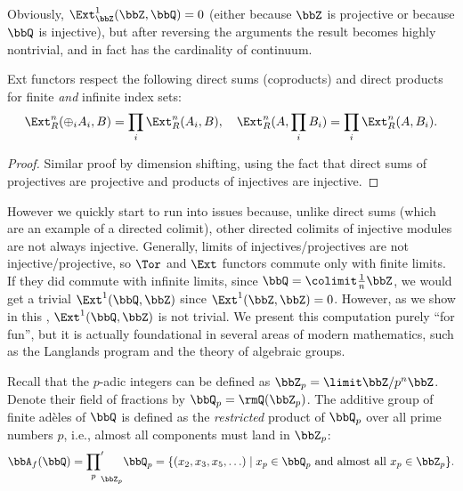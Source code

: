 Obviously, $\Ext^1_\bbZ(\bbZ,\bbQ)=0$ (either because $\bbZ$ is projective or because $\bbQ$ is injective), but after reversing the arguments the result becomes highly nontrivial, and in fact has the cardinality of continuum.

\begin{thm} Ext functors respect the following direct sums (coproducts) and direct products for finite \emph{and} infinite index sets:
    \[\Ext_R^n(\oplus_i A_i,B)=\prod_i\Ext_R^n(A_i,B),\quad \Ext_R^n(A,\prod_i B_i)=\prod_i \Ext_R^n(A,B_i).\]
\end{thm}
\begin{proof}
    Similar proof by dimension shifting, using the fact that direct sums of projectives are projective and products of injectives are injective.
\end{proof}

However we quickly start to run into issues because, unlike direct sums (which are an example of a directed colimit), other directed colimits of injective modules are not always injective. Generally, limits of injectives/projectives are not injective/projective, so $\Tor$ and $\Ext$ functors commute only with finite  limits. If they did commute with infinite limits, since $\bbQ=\colimit \frac{1}{n}\bbZ$, we would get a trivial $\Ext^1(\bbQ,\bbZ)$ since $\Ext^1(\bbZ,\bbZ)=0$. However, as we show in this \sect, $\Ext^1(\bbQ,\bbZ)$ is not trivial. We present this computation purely ``for fun'', but it is actually foundational in several areas of modern mathematics, such as the Langlands program and the theory of algebraic groups.

\begin{defn}
    Recall that the $p$-adic integers can be defined as $\bbZ_p=\limit \bbZ\slash p^n\bbZ$. Denote their field of fractions by $\bbQ_p=\rmQ(\bbZ_p)$. The additive group of finite ad\`eles of $\bbQ$ is defined as the \emph{restricted} product of $\bbQ_p$ over all prime numbers $p$, i.e., almost all components must land in $\bbZ_p$:
    \[\bbA_f(\bbQ)={\prod_{p}}^\prime_{\bbZ_p}\bbQ_p=\{(x_2,x_3,x_5,\ldots)\mid x_p\in\bbQ_p \text{ and almost all }x_p\in\bbZ_p \}.\]
\end{defn}


